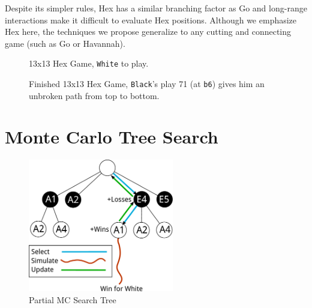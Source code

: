 \documentclass{acm_proc_article-sp}
\newcommand{\hblack}{\texttt{Black}}
\newcommand{\hwhite}{\texttt{White}}
\newcommand{\loc}[1]{\texttt{#1}}
\begin{document}
Despite its simpler rules, Hex has a similar branching factor as Go and long-range interactions make it difficult to 
evaluate Hex positions.
Although we emphasize Hex here, the techniques we propose generalize to any cutting and connecting game
(such as Go or Havannah).

\begin{figure}[tb]
	\caption{13x13 Hex Game, \hwhite{} to play.}
	\label{fig:13x13inprogress}
\end{figure}

\begin{figure}[tb]
	\caption{Finished 13x13 Hex Game, \hblack{}'s play 71 (at \loc{b6}) gives him an unbroken path from top to bottom.}
	\label{fig:13x13finished}
\end{figure}


\section{Monte Carlo Tree Search} \label{mcts}

\begin{figure}
	\begin{center}
	\includegraphics[width=2.5in]{graphics/tree.pdf}
	\end{center}
	\caption{Partial MC Search Tree}
	\label{fig:tree}
\end{figure}
\end{document}
